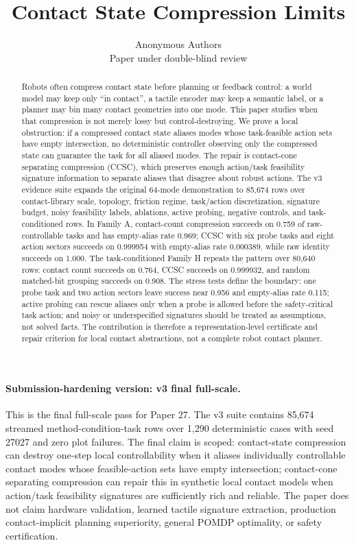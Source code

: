 \documentclass{article}
\title{Contact State Compression Limits}
\author{Anonymous Authors\\
Paper under double-blind review}
\begin{document}
\maketitle

\paragraph{Submission-hardening version: v3 final full-scale.}
This is the final full-scale pass for Paper 27. The v3 suite contains 85,674 streamed method-condition-task rows over 1,290 deterministic cases with seed 27027 and zero plot failures. The final claim is scoped: contact-state compression can destroy one-step local controllability when it aliases individually controllable contact modes whose feasible-action sets have empty intersection; contact-cone separating compression can repair this in synthetic local contact models when action/task feasibility signatures are sufficiently rich and reliable. The paper does not claim hardware validation, learned tactile signature extraction, production contact-implicit planning superiority, general POMDP optimality, or safety certification.

\begin{abstract}
Robots often compress contact state before planning or feedback control: a world model may keep only ``in contact'', a tactile encoder may keep a semantic label, or a planner may bin many contact geometries into one mode. This paper studies when that compression is not merely lossy but control-destroying. We prove a local obstruction: if a compressed contact state aliases modes whose task-feasible action sets have empty intersection, no deterministic controller observing only the compressed state can guarantee the task for all aliased modes. The repair is contact-cone separating compression (CCSC), which preserves enough action/task feasibility signature information to separate aliases that disagree about robust actions. The v3 evidence suite expands the original 64-mode demonstration to 85,674 rows over contact-library scale, topology, friction regime, task/action discretization, signature budget, noisy feasibility labels, ablations, active probing, negative controls, and task-conditioned rows. In Family A, contact-count compression succeeds on 0.759 of raw-controllable tasks and has empty-alias rate 0.969; CCSC with six probe tasks and eight action sectors succeeds on 0.999954 with empty-alias rate 0.000389, while raw identity succeeds on 1.000. The task-conditioned Family H repeats the pattern over 80,640 rows: contact count succeeds on 0.764, CCSC succeeds on 0.999932, and random matched-bit grouping succeeds on 0.908. The stress tests define the boundary: one probe task and two action sectors leave success near 0.956 and empty-alias rate 0.115; active probing can rescue aliases only when a probe is allowed before the safety-critical task action; and noisy or underspecified signatures should be treated as assumptions, not solved facts. The contribution is therefore a representation-level certificate and repair criterion for local contact abstractions, not a complete robot contact planner.
\end{abstract}
\end{document}
